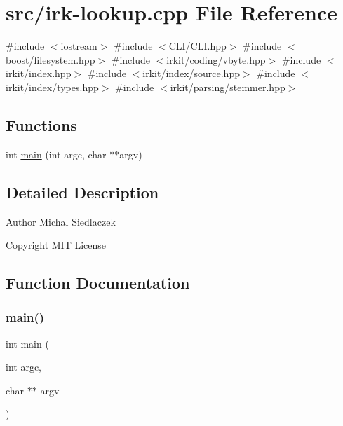 \hypertarget{irk-lookup_8cpp}{}\section{src/irk-\/lookup.cpp File Reference}
\label{irk-lookup_8cpp}
{\ttfamily \#include $<$iostream$>$}\newline
{\ttfamily \#include $<$C\+L\+I/\+C\+L\+I.\+hpp$>$}\newline
{\ttfamily \#include $<$boost/filesystem.\+hpp$>$}\newline
{\ttfamily \#include $<$irkit/coding/vbyte.\+hpp$>$}\newline
{\ttfamily \#include $<$irkit/index.\+hpp$>$}\newline
{\ttfamily \#include $<$irkit/index/source.\+hpp$>$}\newline
{\ttfamily \#include $<$irkit/index/types.\+hpp$>$}\newline
{\ttfamily \#include $<$irkit/parsing/stemmer.\+hpp$>$}\newline
\subsection*{Functions}
\begin{DoxyCompactItemize}
\item 
int \mbox{\hyperlink{irk-lookup_8cpp_a3c04138a5bfe5d72780bb7e82a18e627}{main}} (int argc, char $\ast$$\ast$argv)
\end{DoxyCompactItemize}


\subsection{Detailed Description}
\begin{DoxyAuthor}{Author}
Michal Siedlaczek 
\end{DoxyAuthor}
\begin{DoxyCopyright}{Copyright}
M\+IT License 
\end{DoxyCopyright}


\subsection{Function Documentation}
\mbox{\label{irk-lookup_8cpp_a3c04138a5bfe5d72780bb7e82a18e627}} 
\subsubsection{\texorpdfstring{main()}{main()}}
{\footnotesize\ttfamily int main (\begin{DoxyParamCaption}\item[{int}]{argc,  }\item[{char $\ast$$\ast$}]{argv }\end{DoxyParamCaption})}

